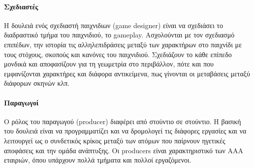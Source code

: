 	\paragraph{Σχεδιαστές}
	Η δουλειά ενός σχεδιαστή παιχνιδιων (game designer) είναι να σχεδιάσει το διαδραστικό τμήμα του παιχνιδιού, το gameplay. Ασχολούνται με τον σχεδιασμό επιπέδων, την ιστορία τις αλληλεπιδράσεις μεταξύ των χαρακτήρων στο παιχνίδι με τους στόχους, σκοπούς και κανόνες του παιχνιδιού.
	Σχεδιάζουν το κάθε επίπεδο μονδικά και αποφασίζουν για τη γεωμετρία στο περιβάλλον, πότε και που εμφανίζονται χαρακτήρες και διάφορα αντικείμενα, πως γίνονται οι μεταβάσεις μεταξύ διάφορων σκηνών κλπ.
	
	\paragraph{Παραγωγοί}
	Ο ρόλος του παραγωγού (producer) διαφέρει από στούντιο σε στούντιο. Η βασική του δουλειά είναι να προγραμματίζει και να δρομολογεί τις διάφορες εργασίες και να λειτουργεί ως ο συνδετικός κρίκος μεταξύ των ατόμων που παίρνουν ηγετικές αποφάσεις και την ομάδα ανάπτυξης. Οι producers είναι χαρακτηριστικό των ΑΑΑ εταιριών, όπου υπάρχουν πολλά τμήματα και πολλοί εργαζόμενοι.	
	
